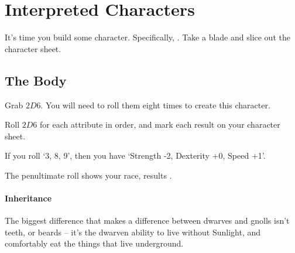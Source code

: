 
\chapter{Interpreted Characters}
\label{character_rolls}

It's time you build some character.
Specifically, .
Take a blade and slice out the character sheet.

\section{The Body}
\begin{multicols}{2}
\noindent
Grab $2D6$.
You will need to roll them eight times to create this character.


Roll $2D6$ for each \gls{attribute} in order, and mark each result on your character sheet.

\begin{exampletext}
  \noindent
  If you roll `3, 8, 9', then you have `Strength -2, Dexterity +0, Speed +1'.
\end{exampletext}

\label{randomCharacterCreation}
\attributeChart

The penultimate roll shows your race, results .


\subsubsection{Inheritance}
\label{racialAbility}

The biggest difference that makes a difference between dwarves and gnolls isn't teeth, or beards -- it's the dwarven ability to live without Sunlight, and comfortably eat the things that live underground.


\end{multicols}

